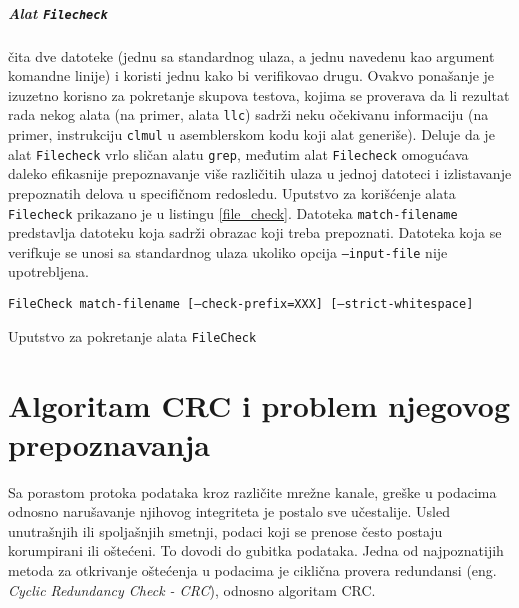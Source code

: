 \documentclass[12pt,oneside]{memoir}
\begin{document}
\paragraph{Alat \texttt{Filecheck}} čita dve datoteke (jednu sa standardnog ulaza, a jednu navedenu kao argument komandne linije) i koristi jednu kako bi verifikovao drugu. Ovakvo ponašanje je izuzetno korisno za pokretanje skupova testova, kojima se proverava da li rezultat rada nekog alata (na primer, alata \texttt{llc}) sadrži neku očekivanu informaciju (na primer, instrukciju \texttt{clmul} u asemblerskom kodu koji alat generiše). Deluje da je alat \texttt{Filecheck} vrlo sličan alatu \texttt{grep}, međutim alat \texttt{Filecheck} omogućava daleko efikasnije prepoznavanje više različitih ulaza u jednoj datoteci i izlistavanje prepoznatih delova u specifičnom redosledu. Uputstvo za korišćenje alata \texttt{Filecheck} prikazano je u listingu \ref{file_check}. Datoteka \texttt{match-filename} predstavlja datoteku koja sadrži obrazac koji treba prepoznati. Datoteka koja se verifkuje se unosi sa standardnog ulaza ukoliko opcija \texttt{--input-file} nije upotrebljena.



\begin{listing}[!ht]
\begin{verbatim}
FileCheck match-filename [–check-prefix=XXX] [–strict-whitespace]
\end{verbatim}
\caption{Uputstvo za pokretanje alata \texttt{FileCheck}}
\label{file_check}
\end{listing}




\chapter{Algoritam CRC i problem njegovog prepoznavanja}
\label{chap:crc}

Sa porastom protoka podataka kroz različite mrežne kanale, greške u podacima odnosno narušavanje 
njihovog integriteta je postalo sve učestalije. Usled unutrašnjih ili spoljašnjih 
smetnji, podaci koji se prenose često postaju korumpirani ili oštećeni. To dovodi do gubitka 
podataka. Jedna od najpoznatijih metoda za otkrivanje oštećenja u podacima je 
ciklična provera redundansi (eng. \textit{Cyclic Redundancy Check - CRC}), odnosno algoritam CRC.
\end{document}
